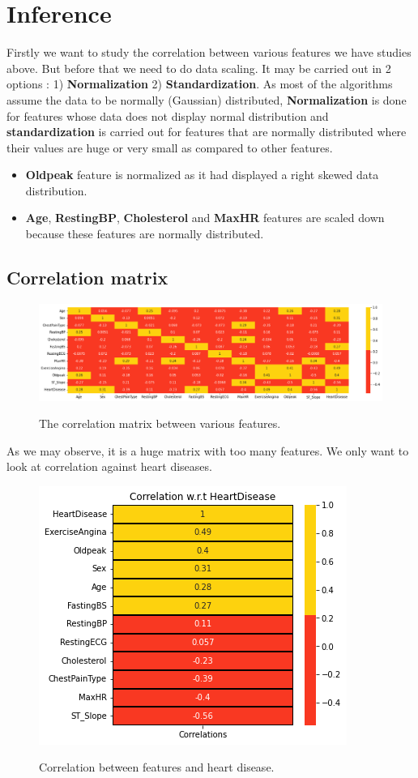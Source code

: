 \chapter{Inference}
Firstly we want to study the correlation between various features we have studies above. But before that we need to do data scaling. It may be carried out in 2 options : 1) \textbf{Normalization} 2) \textbf{Standardization}. As most of the algorithms assume the data to be normally (Gaussian) distributed, \textbf{Normalization} is done for features whose data does not display normal distribution and \textbf{standardization} is carried out for features that are normally distributed where their values are huge or very small as compared to other features.
\begin{itemize}
    \item \textbf{Oldpeak} feature is normalized as it had displayed a right skewed data distribution.
    \item  \textbf{Age}, \textbf{RestingBP}, \textbf{Cholesterol} and \textbf{MaxHR} features are scaled down because these features are normally distributed.
\end{itemize}

\section{Correlation matrix}
\begin{figure}[!htpb]
    \centering
    \includegraphics[width=\linewidth]{Figures/Outputs/corr-mat.png}
    \label{Correlation matrix}
    \caption{The correlation matrix between various features.}
\end{figure}

As we may observe, it is a huge matrix with too many features. We only want to look at correlation against heart diseases.
\begin{figure}[!htpb]
    \centering
    \includegraphics[width=0.7\linewidth]{Figures/Outputs/corr-hd.png}
    \label{Correlation between features and heart disease.}
    \caption{Correlation between features and heart disease.}
\end{figure}

